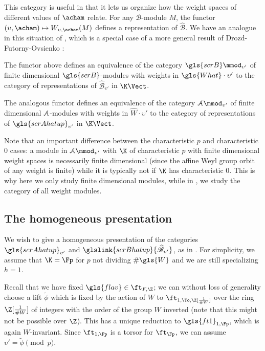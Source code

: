 This category is useful in that it lets us organize how the weight spaces
of different values of $\acham$ relate.  For any $\mathscr{B}$-module
$M$, the functor $(\upsilon, \acham)\mapsto W_{\upsilon,\acham}(M)$
defines a representation of $\widehat{\mathscr{B}}$.  We have an
analogue in this situation of \cite[Lemma 3.22]{WebSD}, which is a
special case of a more general result of Drozd-Futorny-Ovsienko
\cite[Th. 17]{FOD}:
\begin{lemma}
  The functor above defines an equivalence of the category $\gls{scrB}\mmod_{\upsilon'}$ of finite dimensional $\gls{scrB}$-modules with weights in $\gls{What}\cdot \upsilon'$ to
  the category of representations of
  $\widehat{\mathscr{B}}_{\upsilon'}$ in $\K\Vect$.

The analogous functor defines an equivalence of the category $\EuScript{A}\mmod_{\upsilon'}$ of finite dimensional
$\EuScript{A}$-modules  with weights in
$\widehat{W}\cdot \upsilon'$ to the category of
representations of $\gls{scrAhatup}_{\upsilon'}$ in $\K\Vect$.
\end{lemma} 
Note that an important difference
between the characteristic $p$ and characteristic $0$ cases:
a module in $\EuScript{A}\mmod_{\upsilon'}$ with $\K$ of characteristic $p$ with finite dimensional
weight spaces is necessarily finite dimensional (since the affine Weyl
group orbit of any weight is finite) while it is typically not if $\K$
has 
characteristic $0$. This is why here we only study finite dimensional
modules, while in \cite{WebSD}, we study the category of all weight modules.


\subsection{The homogeneous presentation}
\label{sec:homo}
We wish to give a homogeneous presentation of the categories
$\gls{scrAhatup}_{\upsilon'}$ and
$\glslink{scrBhatup}{\mathscr{\widehat{B}}_{\upsilon'}}$, as in
\cite[\S 4]{WebSD}.  For simplicity, we assume that $\K=\Fp$ for
$p$ not dividing $\# \gls{W}$ and we are still specializing $h=1$.  


Recall that we have fixed $\gls{flav}\in \ft_{F,\Z}$; we can without
loss of generality choose a lift $\tilde{\phi}$ which is fixed by the action of $W$  to $\ft_{1,\To,
  \Z[\frac{1}{\# W}]}$ over the ring $\Z[\frac{1}{\# W}]$ of integers with the order of the
group $W$ inverted 
(note that this might not be
possible over $\Z$).   This has a unique reduction to
$\gls{ft1}_{1,\Fp}$, which is again $W$-invariant.  Since
$\ft_{1,\Fp}$ is a torsor for $\ft_{\Fp}$, we can assume
$\upsilon'=\tilde{\phi}\pmod {p}$.

